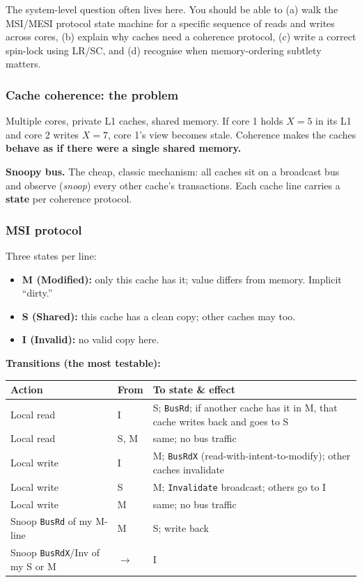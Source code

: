 \documentclass[11pt,a4paper]{article}
\begin{document}
\begin{must}
The system-level question often lives here. You should be able to (a) walk the MSI/MESI protocol state machine for a specific sequence of reads and writes across cores, (b) explain why caches need a coherence protocol, (c) write a correct spin-lock using LR/SC, and (d) recognise when memory-ordering subtlety matters.
\end{must}

\subsubsection*{Cache coherence: the problem}

Multiple cores, private L1 caches, shared memory. If core 1 holds $X = 5$ in its L1 and core 2 writes $X = 7$, core 1's view becomes stale. Coherence makes the caches \textbf{behave as if there were a single shared memory.}

\textbf{Snoopy bus.} The cheap, classic mechanism: all caches sit on a broadcast bus and observe (\emph{snoop}) every other cache's transactions. Each cache line carries a \textbf{state} per coherence protocol.

\subsubsection*{MSI protocol}

Three states per line:

\begin{itemize}[leftmargin=*,itemsep=1pt]
  \item \textbf{M (Modified):} only this cache has it; value differs from memory. Implicit ``dirty.''
  \item \textbf{S (Shared):} this cache has a clean copy; other caches may too.
  \item \textbf{I (Invalid):} no valid copy here.
\end{itemize}

\textbf{Transitions (the most testable):}

\begin{center}
\begin{tabular}{p{4.5cm}p{1.7cm}p{8.5cm}}
\hline
\textbf{Action} & \textbf{From} & \textbf{To state \& effect} \\
\hline
Local read   & I & S; \texttt{BusRd}; if another cache has it in M, that cache writes back and goes to S \\
Local read   & S, M & same; no bus traffic \\
Local write  & I & M; \texttt{BusRdX} (read-with-intent-to-modify); other caches invalidate \\
Local write  & S & M; \texttt{Invalidate} broadcast; others go to I \\
Local write  & M & same; no bus traffic \\
Snoop \texttt{BusRd} of my M-line  & M & S; write back \\
Snoop \texttt{BusRdX}/Inv of my S or M & $\to$ & I \\
\hline
\end{tabular}
\end{center}
\end{document}
